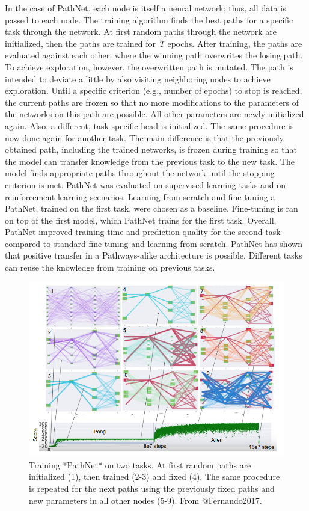 \documentclass[
]{krantz}
\begin{document}
In the case of PathNet, each node is itself a neural network; thus, all data is passed to each node. The training algorithm finds the best paths for a specific task through the network. At first random paths through the network are initialized, then the paths are trained for \emph{T} epochs. After training, the paths are evaluated against each other, where the winning path overwrites the losing path. To achieve exploration, however, the overwritten path is mutated. The path is intended to deviate a little by also visiting neighboring nodes to achieve exploration. Until a specific criterion (e.g., number of epochs) to stop is reached, the current paths are frozen so that no more modifications to the parameters of the networks on this path are possible. All other parameters are newly initialized again. Also, a different, task-specific head is initialized. The same procedure is now done again for another task. The main difference is that the previously obtained path, including the trained networks, is frozen during training so that the model can transfer knowledge from the previous task to the new task. The model finds appropriate paths throughout the network until the stopping criterion is met. PathNet was evaluated on supervised learning tasks and on reinforcement learning scenarios. Learning from scratch and fine-tuning a PathNet, trained on the first task, were chosen as a baseline. Fine-tuning is ran on top of the first model, which PathNet trains for the first task. Overall, PathNet improved training time and prediction quality for the second task compared to standard fine-tuning and learning from scratch. PathNet has shown that positive transfer in a Pathways-alike architecture is possible. Different tasks can reuse the knowledge from training on previous tasks.

\begin{figure}

{\centering \includegraphics[width=0.8\linewidth]{figures/03-03-multipurpose/PathNet} 

}

\caption{Training *PathNet* on two tasks. At first random paths are initialized (1), then trained (2-3) and fixed (4). The same procedure is repeated for the next paths using the previously fixed paths and new parameters in all other nodes (5-9). From @Fernando2017.}\label{fig:pathnet}
\end{figure}
\end{document}
